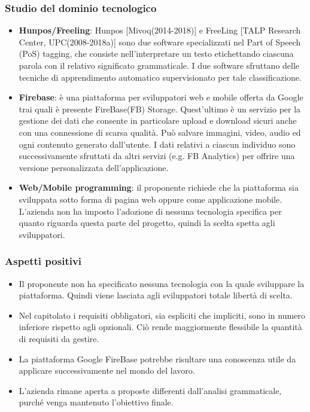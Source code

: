 \subsubsection{Studio del dominio tecnologico}
\begin{itemize}
	\item \textbf{Hunpos/Freeling}: Hunpos [Mivoq(2014-2018)] e FreeLing [TALP Research Center, UPC(2008-2018a)] sono due software specializzati nel Part of Speech (PoS) tagging, che consiste nell'interpretare un testo etichettando ciascuna parola con il relativo significato grammaticale. I due software sfruttano delle tecniche di apprendimento automatico supervisionato per tale classificazione.  
	
	\item \textbf{Firebase}: è una piattaforma per sviluppatori web e mobile offerta da Google trai quali è presente FireBase(FB) Storage. Quest'ultimo è un servizio per la gestione dei dati che consente in particolare upload e download sicuri anche con una connessione di scarsa qualità. Può salvare immagini, video, audio ed ogni contenuto generato dall'utente. I dati relativi a ciascun individuo sono successivamente sfruttati da altri servizi (e.g. FB Analytics) per offrire una versione personalizzata dell'applicazione.
	\item \textbf{Web/Mobile programming}: il proponente richiede che la piattaforma sia sviluppata sotto forma di pagina web oppure come applicazione mobile. L'azienda non ha imposto l'adozione di nessuna tecnologia specifica per quanto riguarda questa parte del progetto, quindi la scelta spetta agli sviluppatori.		
\end{itemize}
\subsubsection{Aspetti positivi}
\begin{itemize}
	\item Il proponente non ha specificato nessuna tecnologia con la quale sviluppare la piattaforma. Quindi viene lasciata agli sviluppatori totale libertà di scelta.
	\item Nel capitolato i requisiti obbligatori, sia espliciti che impliciti, sono in numero inferiore rispetto agli opzionali. Ciò rende maggiormente flessibile la quantità di requisiti da gestire.
	\item La piattaforma Google FireBase potrebbe risultare una conoscenza utile da applicare successivamente nel mondo del lavoro.
	\item L'azienda rimane aperta a proposte differenti dall'analisi grammaticale, purché venga mantenuto l'obiettivo finale.
	
\end{itemize}

